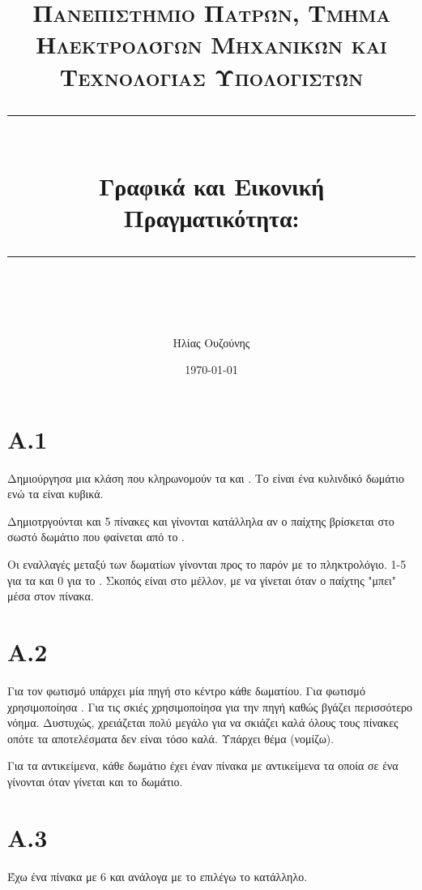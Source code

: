 \documentclass[11pt]{scrartcl} %
\title{	
	\normalfont\normalsize
	\textsc{Πανεπιστήμιο Πατρών, Τμήμα Ηλεκτρολόγων Μηχανικών και Τεχνολογίας Υπολογιστών}\\ %
	\vspace{25pt} %
	\rule{\linewidth}{0.5pt}\\ %
	\vspace{20pt} %
	{\huge Γραφικά και Εικονική Πραγματικότητα: \en{Art Gallery}}\\ %
	\vspace{12pt} %
	\rule{\linewidth}{2pt}\\ %
	\vspace{12pt} %
}
\author{\LARGE Ηλίας Ουζούνης \\ \en{up1083749}} %
\date{\normalsize\today} %
\begin{document}
\maketitle

\newpage

\section*{A.1}
Δημιούργησα μια κλάση  που κληρωνομούν τα  και . Το  είναι ένα
κυλινδικό δωμάτιο ενώ τα  είναι κυβικά. 

Δημιοτργούνται και 5 πίνακες και γίνονται κατάλληλα  αν ο παίχτης βρίσκεται στο σωστό δωμάτιο που φαίνεται από
το .

Οι εναλλαγές μεταξύ των δωματίων γίνονται προς το παρόν με το πληκτρολόγιο.
1-5 για τα  και 0 για το . Σκοπός είναι στο μέλλον, με  να γίνεται όταν ο 
παίχτης "μπει" μέσα στον πίνακα.


\section*{A.2}
Για τον φωτισμό υπάρχει μία πηγή στο κέντρο κάθε δωματίου. Για φωτισμό χρησιμοποίησα . Για τις σκιές χρησιμοποίησα 
 για την πηγή καθώς βγάζει περισσότερο νόημα. Δυστυχώς, χρειάζεται πολύ μεγάλο  για να σκιάζει
καλά όλους τους πίνακες οπότε τα αποτελέσματα δεν είναι τόσο καλά. Υπάρχει θέμα  (νομίζω).

Για τα αντικείμενα, κάθε δωμάτιο έχει έναν πίνακα με αντικείμενα τα οποία σε ένα  γίνονται  όταν γίνεται 
και το δωμάτιο.

\section*{A.3}
Έχω ένα πίνακα με 6  και ανάλογα με το  επιλέγω το κατάλληλο.
\end{document}
